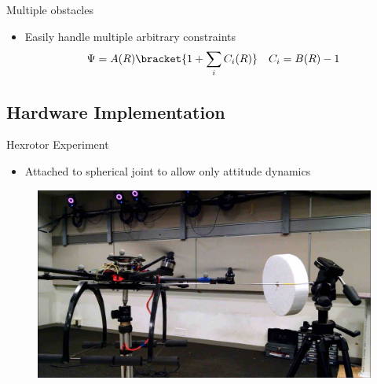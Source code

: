 \begin{frame}{Multiple obstacles}%

\begin{itemize}
    \item Easily handle multiple arbitrary constraints 
    \begin{align*}
        \Psi = A(R) \bracket{1 + \sum_i C_i(R)} \quad C_i = B(R) - 1
    \end{align*}
\end{itemize}

\begin{figure}
    \centering
\end{figure}

\end{frame}%

\subsection*{Hardware Implementation}

\begin{frame}{Hexrotor Experiment} %
\begin{itemize}
    \item Attached to spherical joint to allow only attitude dynamics
\end{itemize}
\begin{figure}
    \centering
    \href{https://youtu.be/dsmAbwQram4?t=20s}{\includegraphics[height=0.7\textheight]{figures/2016ACC/hexrotor}}
\end{figure}
\end{frame}   %